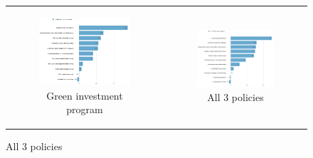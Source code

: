 \documentclass{article}
\begin{document}
\begin{figure}[h!]
\begin{center}
	\begin{tabular}{cc}
		\begin{subfigure}{0.5\textwidth}
		\caption{Green investment program}
			\includegraphics[width=\textwidth]{gelbach_right_investments_D2SD}
		\end{subfigure}&
		\begin{subfigure}{0.5\textwidth}
		\caption{All 3 policies}
			\includegraphics[width=\textwidth]{gelbach_right_main_policies_D2SD}
		\end{subfigure}\\
	\end{tabular}
\end{center}

\end{figure}
\end{document}
